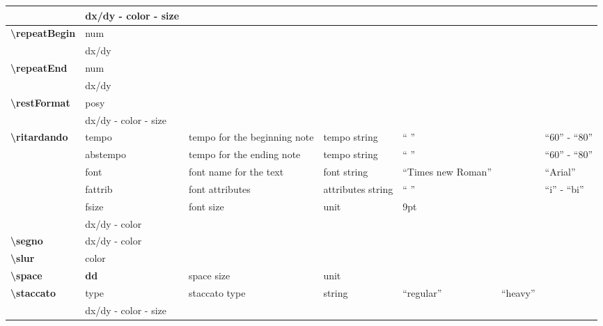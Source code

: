 \documentclass[a4paper, landscape, 10pt]{article}
\begin{document}
\begin{tabularx}{\linewidth}{p{3cm}p{3cm}p{5cm}p{3cm}p{2cm}p{3.5cm}p{4cm}}
    &dx/dy - color - size&&&&&\\
    \hline
    \textbf{\textbackslash{}repeatBegin}&num&&&&&\\ %
    &dx/dy&&&&&\\
    \hline
    \textbf{\textbackslash{}repeatEnd}&num&&&&&\\ %
    &dx/dy&&&&&\\
    \hline
    \textbf{\textbackslash{}restFormat}&posy&&&&&\\ %
    &dx/dy - color - size&&&&&\\
    \hline
    \textbf{\textbackslash{}ritardando}&tempo&tempo for the beginning note&tempo string&`` ''&&``60'' - ``80''\\
    &abstempo&tempo for the ending note&tempo string&`` ''&&``60'' - ``80''\\
    &font&font name for the text&font string&``Times new Roman''&&``Arial''\\
    &fattrib&font attributes&attributes string&`` ''&&``i'' - ``bi''\\
    &fsize&font size&unit&9pt&&\\
    &dx/dy - color&&&&&\\
    \hline
	\textbf{\textbackslash{}segno}&dx/dy - color&&&&&\\
    \hline
	\textbf{\textbackslash{}slur}&color&&&&&\\
    \hline
    \textbf{\textbackslash{}space}&\textbf{dd}&space size&unit&&&\\
    \hline
    \textbf{\textbackslash{}staccato}&type&staccato type&string&``regular''&``heavy''&\\
    &dx/dy - color - size&&&&&\\
    \hline
\end{tabularx}
\end{document}
